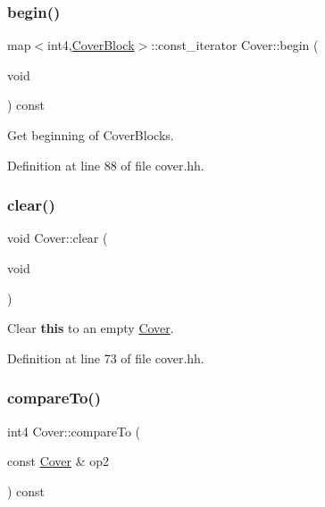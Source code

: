 \subsubsection{\texorpdfstring{begin()}{begin()}}
{\footnotesize\ttfamily map$<$int4,\mbox{\hyperlink{class_cover_block}{Cover\+Block}}$>$\+::const\+\_\+iterator Cover\+::begin (\begin{DoxyParamCaption}\item[{void}]{ }\end{DoxyParamCaption}) const\hspace{0.3cm}{\ttfamily [inline]}}



Get beginning of Cover\+Blocks. 



Definition at line 88 of file cover.\+hh.

\mbox{\label{class_cover_abd61e505d94ee4774057ea6f64bd2e45}} 
\subsubsection{\texorpdfstring{clear()}{clear()}}
{\footnotesize\ttfamily void Cover\+::clear (\begin{DoxyParamCaption}\item[{void}]{ }\end{DoxyParamCaption})\hspace{0.3cm}{\ttfamily [inline]}}



Clear {\bfseries{this}} to an empty \mbox{\hyperlink{class_cover}{Cover}}. 



Definition at line 73 of file cover.\+hh.

\mbox{\label{class_cover_a68814b7596c3f4be6452792ca2961cb7}} 
\subsubsection{\texorpdfstring{compareTo()}{compareTo()}}
{\footnotesize\ttfamily int4 Cover\+::compare\+To (\begin{DoxyParamCaption}\item[{const \mbox{\hyperlink{class_cover}{Cover}} \&}]{op2 }\end{DoxyParamCaption}) const}



